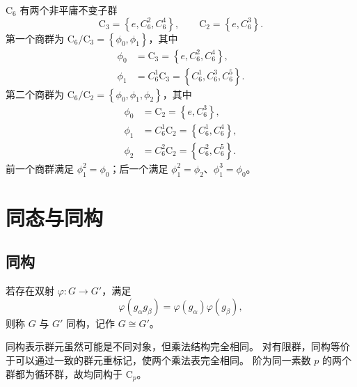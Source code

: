 \begin{example}
$\mathrm{C}_6$ 有两个非平庸不变子群
\begin{equation}
\mathrm{C}_3=\left\{e,C_6^2,C_6^4\right\},\qquad
\mathrm{C}_2=\left\{e,C_6^3\right\}.
\end{equation}
第一个商群为 $\mathrm{C}_6/\mathrm{C}_3=\left\{\phi_0,\phi_1\right\}$，其中
\begin{align}
\phi_0&=\mathrm{C}_3=\left\{e,C_6^2,C_6^4\right\},\\
\phi_1&=C_6^1\mathrm{C}_3=\left\{C_6^1,C_6^3,C_6^5\right\}.
\end{align}
第二个商群为 $\mathrm{C}_6/\mathrm{C}_2=\left\{\phi_0,\phi_1,\phi_2\right\}$，其中
\begin{align}
\phi_0&=\mathrm{C}_2=\left\{e,C_6^3\right\},\\
\phi_1&=C_6^1\mathrm{C}_2=\left\{C_6^1,C_6^4\right\},\\
\phi_2&=C_6^2\mathrm{C}_2=\left\{C_6^2,C_6^5\right\}.
\end{align}
前一个商群满足 $\phi_1^2=\phi_0$；后一个满足
$\phi_1^2=\phi_2$、$\phi_1^3=\phi_0$。
\end{example}

\section{同态与同构}
\subsection{同构}
\begin{definition}[群同构]
若存在双射 $\varphi:G\to G'$，满足
\begin{equation}
\varphi\left(g_\alpha g_\beta\right)=\varphi\left(g_\alpha\right)\varphi\left(g_\beta\right),
\end{equation}
则称 $G$ 与 $G'$ 同构，记作 $G\cong G'$。
\end{definition}
同构表示群元虽然可能是不同对象，但乘法结构完全相同。
对有限群，同构等价于可以通过一致的群元重标记，使两个乘法表完全相同。
阶为同一素数 $p$ 的两个群都为循环群，故均同构于 $\mathrm{C}_p$。

